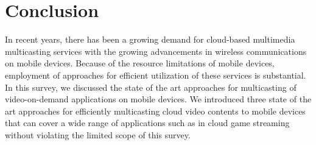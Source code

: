 \section{Conclusion}
\label{sec:conclusion}

In recent years, there has been a growing demand for cloud-based multimedia multicasting services with the growing advancements in wireless communications on mobile devices. Because of the resource limitations of mobile devices, employment of approaches for efficient utilization of these services is substantial. In this survey, we discussed the state of the art approaches for multicasting of video-on-demand applications on mobile devices. We introduced three state of the art approaches for efficiently multicasting cloud video contents to mobile devices that can cover a wide range of applications such as in cloud game streaming without violating the limited scope of this survey.

